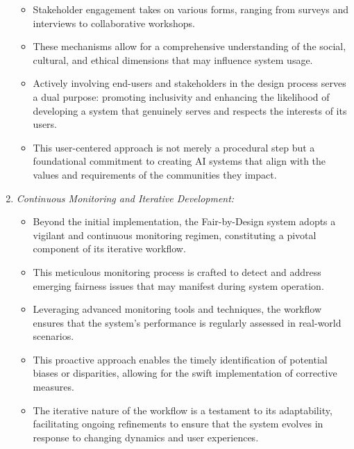 \begin{enumerate}[label=\arabic*.]
\begin{itemize}
        \item Stakeholder engagement takes on various forms, ranging from surveys and interviews to collaborative workshops.
      
        \item These mechanisms allow for a comprehensive understanding of the social, cultural, and ethical dimensions that may influence system usage.
       
        \item Actively involving end-users and stakeholders in the design process serves a dual purpose: promoting inclusivity and enhancing the likelihood of developing a system that genuinely serves and respects the interests of its users.
       
        \item This user-centered approach is not merely a procedural step but a foundational commitment to creating AI systems that align with the values and requirements of the communities they impact.
    
    \end{itemize}

    \item \emph{Continuous Monitoring and Iterative Development:}
    
    \begin{itemize}
     
        \item Beyond the initial implementation, the Fair-by-Design system adopts a vigilant and continuous monitoring regimen, constituting a pivotal component of its iterative workflow.
     
        \item This meticulous monitoring process is crafted to detect and address emerging fairness issues that may manifest during system operation.
     
        \item Leveraging advanced monitoring tools and techniques, the workflow ensures that the system's performance is regularly assessed in real-world scenarios.
      
        \item This proactive approach enables the timely identification of potential biases or disparities, allowing for the swift implementation of corrective measures.
     
        \item The iterative nature of the workflow is a testament to its adaptability, facilitating ongoing refinements to ensure that the system evolves in response to changing dynamics and user experiences.
     

\end{itemize}
\end{enumerate}
